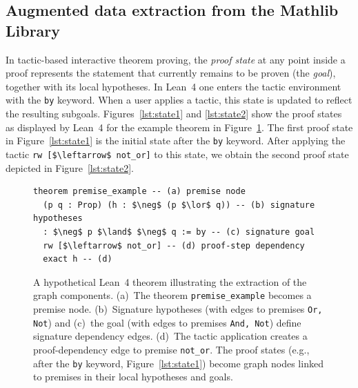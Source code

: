 \subsection{Augmented data extraction from the Mathlib Library}
In tactic-based interactive theorem proving, the \emph{proof state} at any point inside a proof represents the statement that currently remains to be proven (the \emph{goal}), together with its local hypotheses. In Lean~4 one enters the tactic environment with the \texttt{by} keyword. When a user applies a tactic, this state is updated to reflect the resulting subgoals. Figures~\ref{lst:state1} and \ref{lst:state2} show the proof states as displayed by Lean~4 for the example theorem in Figure~\ref{fig:premise_example}. The first proof state in Figure~\ref{lst:state1} is the initial state after the \texttt{by} keyword. After applying the tactic \lstinline[language=lean]|rw [$\leftarrow$ not_or]| to this state, we obtain the second proof state depicted in Figure~\ref{lst:state2}.

\begin{figure}[h]
\centering
\begin{lstlisting}[language=lean, caption={Lean theorem using listings}]
theorem premise_example -- (a) premise node
  (p q : Prop) (h : $\neg$ (p $\lor$ q)) -- (b) signature hypotheses
  : $\neg$ p $\land$ $\neg$ q := by -- (c) signature goal
  rw [$\leftarrow$ not_or] -- (d) proof-step dependency
  exact h -- (d)
\end{lstlisting}

\caption{A hypothetical Lean~4 theorem illustrating the extraction of the graph components. \textup{(a)}~The theorem \texttt{premise\_example} becomes a premise node. \textup{(b)}~Signature hypotheses (with edges to premises \texttt{Or, Not}) and \textup{(c)}~the goal (with edges to premises \texttt{And, Not}) define signature dependency edges. \textup{(d)}~The tactic application creates a proof-dependency edge to premise \texttt{not\_or}. The proof states (e.g., after the \texttt{by} keyword, Figure~\ref{lst:state1}) become graph nodes linked to premises in their local hypotheses and goals.}
\label{fig:premise_example}
\end{figure}


